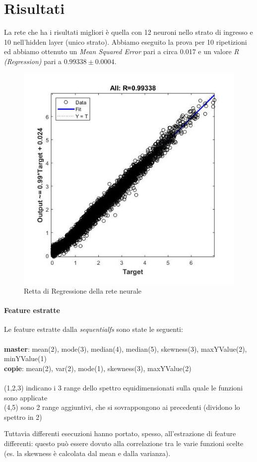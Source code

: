 \section{Risultati}
La rete che ha i risultati migliori è quella con 12 neuroni nello strato di ingresso e 10 nell'hidden layer (unico strato). Abbiamo eseguito la prova per 10 ripetizioni ed abbiamo ottenuto un \textit{Mean Squared Error} pari a circa 0.017 e un valore \textit{R (Regression)} pari a \(0.99338 \pm 0.0004\).

\begin{figure}
\begin{center}
	\includegraphics[scale=0.7]{images/rete1-regression.jpg}
\end{center}
\caption{Retta di Regressione della rete neurale}
\end{figure}

\paragraph{Feature estratte}
Le feature estratte dalla \textit{sequentialfs} sono state le seguenti:
\\\\
\textbf{master}: mean(2), mode(3), median(4), median(5), skewness(3), maxYValue(2), minYValue(1)
\\
\textbf{copie}: mean(2), var(2), mode(1), skewness(3), maxYValue(2)
\\\\(1,2,3) indicano i 3 range dello spettro equidimensionati sulla quale le funzioni sono applicate
\\(4,5) sono 2 range aggiuntivi, che si sovrappongono ai precedenti (dividono lo spettro in 2)

Tuttavia differenti esecuzioni hanno portato, spesso, all'estrazione di feature differenti: questo può essere dovuto alla correlazione tra le varie funzioni scelte (es. la skewness è calcolata dal mean e dalla varianza).